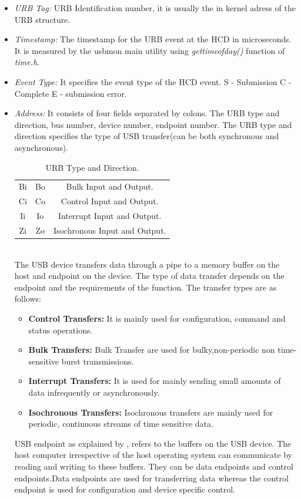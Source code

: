 \documentclass{kththesis}
\begin{document}
\begin{itemize}
\item {\textit{URB Tag:} URB Identification number, it is usually the in kernel adress of the URB structure.}
\item{\textit{Timestamp:} The timestamp for the URB event at the HCD in microseconds. It is measured by the usbmon main utility using \textit{gettimeofday()} function of \textit{time.h}.}
\item{\textit{Event Type:} It specifies the event type of the HCD event. S - Submission C -Complete E - submission error.}
\item{\textit{Address: } It consists of four fields separated by colons. The URB type and direction, bus number, device number, endpoint number. The URB type and direction specifies the type of USB transfer(can be both synchronous and asynchronous).\\
\begin{table}[h!]
\centering
\begin{tabular}{|c|c|c|}
\hline
Bi & Bo & Bulk Input and Output.\\
Ci & Co & Control Input and Output.\\
Ii & Io & Interrupt Input and Output.\\
Zi & Zo & Isochronous Input and Output.\\
\hline
\end{tabular}
\caption{URB Type and Direction.}
\end{table}\\
The USB device transfers data through a pipe to a memory buffer on the host and endpoint on the device. The type of data transfer depends on the endpoint and the requirements of the function. The transfer types are as follows\cite{_usb_data_transfer}:

\begin{itemize}
\item{\textbf{Control Transfers:} It is mainly used for configuration, command and status operations.}
\item{\textbf{Bulk Transfers:} Bulk Transfer are used for bulky,non-periodic non time-sensitive burst transmissions.}
\item{\textbf{Interrupt Transfers:} It is used for mainly sending small amounts of data infrequently or asynchronously.}
\item{\textbf{Isochronous Transfers:} Isochronous transfers are mainly used for periodic, continuous streams of time sensitive data.} 
\end{itemize}
USB endpoint as explained by \cite{_usb_endpoint} , refers to the buffers on the USB device. The host computer irrespective of the host operating system can communicate by reading and writing to these buffers. They can be data endpoints and control endpoints.Data endpoints are used for transferring data whereas the control endpoint is used for configuration and device specific control.
}


\end{itemize}
\end{document}
